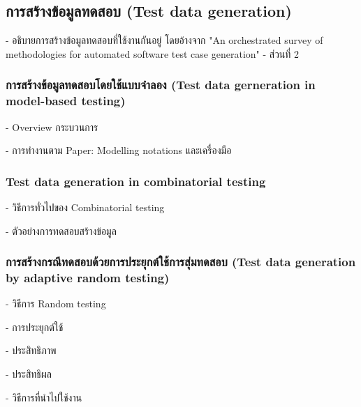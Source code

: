 \subsection{การสร้างข้อมูลทดสอบ (Test data generation)}

- อธิบายการสร้างข้อมูลทดสอบที่ใช้งานกันอยู่ โดยอ้างจาก "An orchestrated survey of methodologies for automated software test case generation" \cite{Anand2013} - ส่วนที่ 2

\subsubsection{การสร้างข้อมูลทดสอบโดยใช้แบบจำลอง (Test data gerneration in model-based testing)}

- Overview กระบวนการ

- การทำงานตาม Paper: Modelling notations และเครื่องมือ

\subsubsection{Test data generation in combinatorial testing}

- วิธีการทั่วไปของ Combinatorial testing 

- ตัวอย่างการทดสอบสร้างข้อมูล

\subsubsection{การสร้างกรณีทดสอบด้วยการประยุกต์ใช้การสุ่มทดสอบ (Test data generation by adaptive random testing)}

- วิธีการ Random testing 

- การประยุกต์ใช้

- ประสิทธิภาพ

- ประสิทธิผล

- วิธีการที่นำไปใช้งาน
